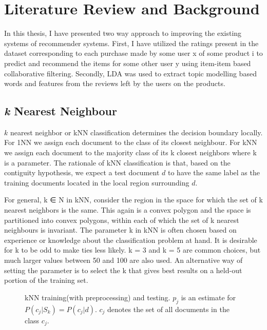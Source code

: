 \chapter{Literature Review and Background}

In this thesis, I have presented two way approach to improving the existing systems of recommender systems.
First, I have utilized the ratings present in the dataset corresponding to each purchase made by some user x of some product i to predict and recommend the items for some other user y using item-item based collaborative filtering. Secondly, LDA was used to extract topic modelling based words and features from the reviews left by the users on the products.

\section{\textit{k} Nearest Neighbour}
$k$ nearest neighbor or kNN classification determines the decision boundary locally. For 1NN we assign each document to the class of its closest neighbour. For kNN we assign each document to the majority class of its k closest neighbors where k is a parameter. The rationale of kNN classification is that, based on the contiguity hypothesis, we expect a test document $d$ to have the same label as the training documents located in the local region
surrounding $d$.

For general, k ∈ N in kNN, consider the region in the space for which the set of k nearest neighbors is the same. This again is a convex polygon and the space is partitioned into convex polygons, within each of which the set of k nearest neighbours is invariant.
The parameter k in kNN is often chosen based on experience or knowledge about the classification problem at hand.  It is desirable for k to be odd to make ties less likely. k = 3 and k = 5 are common choices, but much larger values between 50 and 100 are also used.  An alternative way of setting the parameter is to select the k that gives best results on a held-out portion of the training set.
\begin{figure}[H]
    {\par}
    \caption{kNN  training(with preprocessing) and testing. $p_{j}$ is an estimate for $P(c_{j}|S_{k}) = P(c_{j}|d)$. $c_{j}$ denotes the set of all documents in the class $c_{j}$.}
\end{figure}

